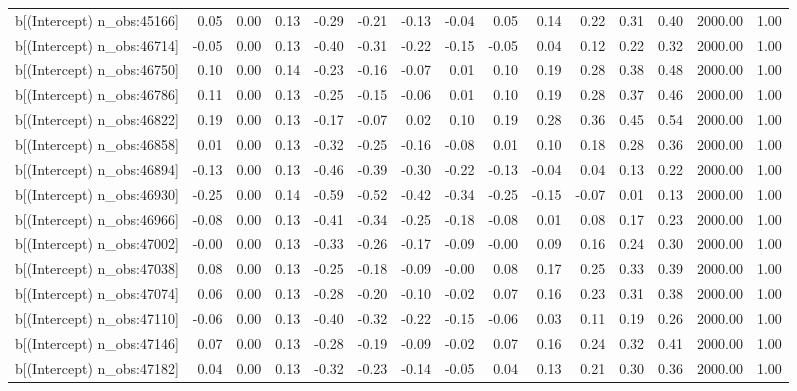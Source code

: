 \begin{table}[ht]
\begin{tabular}{rrrrrrrrrrrrrrr}
  b[(Intercept) n\_obs:45166] & 0.05 & 0.00 & 0.13 & -0.29 & -0.21 & -0.13 & -0.04 & 0.05 & 0.14 & 0.22 & 0.31 & 0.40 & 2000.00 & 1.00 \\ 
  b[(Intercept) n\_obs:46714] & -0.05 & 0.00 & 0.13 & -0.40 & -0.31 & -0.22 & -0.15 & -0.05 & 0.04 & 0.12 & 0.22 & 0.32 & 2000.00 & 1.00 \\ 
  b[(Intercept) n\_obs:46750] & 0.10 & 0.00 & 0.14 & -0.23 & -0.16 & -0.07 & 0.01 & 0.10 & 0.19 & 0.28 & 0.38 & 0.48 & 2000.00 & 1.00 \\ 
  b[(Intercept) n\_obs:46786] & 0.11 & 0.00 & 0.13 & -0.25 & -0.15 & -0.06 & 0.01 & 0.10 & 0.19 & 0.28 & 0.37 & 0.46 & 2000.00 & 1.00 \\ 
  b[(Intercept) n\_obs:46822] & 0.19 & 0.00 & 0.13 & -0.17 & -0.07 & 0.02 & 0.10 & 0.19 & 0.28 & 0.36 & 0.45 & 0.54 & 2000.00 & 1.00 \\ 
  b[(Intercept) n\_obs:46858] & 0.01 & 0.00 & 0.13 & -0.32 & -0.25 & -0.16 & -0.08 & 0.01 & 0.10 & 0.18 & 0.28 & 0.36 & 2000.00 & 1.00 \\ 
  b[(Intercept) n\_obs:46894] & -0.13 & 0.00 & 0.13 & -0.46 & -0.39 & -0.30 & -0.22 & -0.13 & -0.04 & 0.04 & 0.13 & 0.22 & 2000.00 & 1.00 \\ 
  b[(Intercept) n\_obs:46930] & -0.25 & 0.00 & 0.14 & -0.59 & -0.52 & -0.42 & -0.34 & -0.25 & -0.15 & -0.07 & 0.01 & 0.13 & 2000.00 & 1.00 \\ 
  b[(Intercept) n\_obs:46966] & -0.08 & 0.00 & 0.13 & -0.41 & -0.34 & -0.25 & -0.18 & -0.08 & 0.01 & 0.08 & 0.17 & 0.23 & 2000.00 & 1.00 \\ 
  b[(Intercept) n\_obs:47002] & -0.00 & 0.00 & 0.13 & -0.33 & -0.26 & -0.17 & -0.09 & -0.00 & 0.09 & 0.16 & 0.24 & 0.30 & 2000.00 & 1.00 \\ 
  b[(Intercept) n\_obs:47038] & 0.08 & 0.00 & 0.13 & -0.25 & -0.18 & -0.09 & -0.00 & 0.08 & 0.17 & 0.25 & 0.33 & 0.39 & 2000.00 & 1.00 \\ 
  b[(Intercept) n\_obs:47074] & 0.06 & 0.00 & 0.13 & -0.28 & -0.20 & -0.10 & -0.02 & 0.07 & 0.16 & 0.23 & 0.31 & 0.38 & 2000.00 & 1.00 \\ 
  b[(Intercept) n\_obs:47110] & -0.06 & 0.00 & 0.13 & -0.40 & -0.32 & -0.22 & -0.15 & -0.06 & 0.03 & 0.11 & 0.19 & 0.26 & 2000.00 & 1.00 \\ 
  b[(Intercept) n\_obs:47146] & 0.07 & 0.00 & 0.13 & -0.28 & -0.19 & -0.09 & -0.02 & 0.07 & 0.16 & 0.24 & 0.32 & 0.41 & 2000.00 & 1.00 \\ 
  b[(Intercept) n\_obs:47182] & 0.04 & 0.00 & 0.13 & -0.32 & -0.23 & -0.14 & -0.05 & 0.04 & 0.13 & 0.21 & 0.30 & 0.36 & 2000.00 & 1.00 \\ 

\end{tabular}
\end{table}
